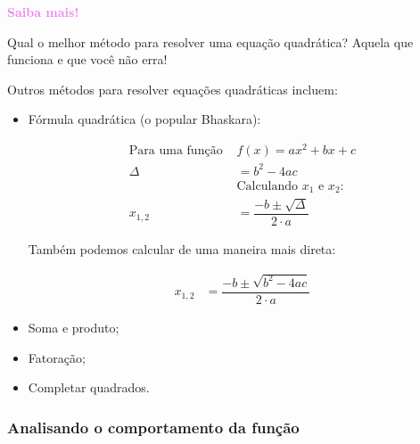\documentclass[12pt,openright,twoside,a4paper]{article}
\theoremstyle{definition}
\begin{document}
	\begin{snugshade}
		\textbf{\textcolor{violet}{Saiba mais!}}
		
		Qual o melhor método para resolver uma equação quadrática? Aquela que funciona e que você não erra!
		
		Outros métodos para resolver equações quadráticas incluem:
		
		\begin{itemize}
			\item Fórmula quadrática (o popular Bhaskara):
			
				\begin{align*}
					\text{Para uma função } & f(x) = ax^2 + bx + c\\
					\Delta &= b^2 - 4ac\\
					&\text{Calculando $x_1$ e $x_2$:}\\
					x_{1,2} &= \dfrac{- b \pm \sqrt{\Delta}}{2 \cdot a}
				\end{align*}
				
				Também podemos calcular de uma maneira mais direta:
				
				\begin{align*}
					x_{1,2} &= \dfrac{- b \pm \sqrt{b^2 - 4ac}}{2 \cdot a}
				\end{align*}
			
			\item Soma e produto;
			\item Fatoração;
			\item Completar quadrados.
		\end{itemize}
	\end{snugshade}
	
	\subsubsection{Analisando o comportamento da função}
	
\end{document}

